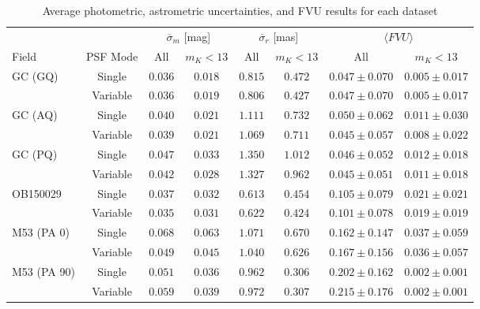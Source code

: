 \documentclass[]{spie}  %
\begin{document}
\begin{table}[!h]
\caption{Average photometric, astrometric uncertainties, and FVU results for each dataset}
\setlength{\tabcolsep}{7.0pt}
\begin{center}
\begin{tabular}{lccccccc}
    \hline\hline
    {} & {} & \multicolumn{2}{c}{$\overline{\sigma}_{m}$ [mag]} & \multicolumn{2}{c}{$\overline{\sigma}_{r}$ [mas]} & \multicolumn{2}{c}{$\langle FVU \rangle$}\\
    \cmidrule(lr){3-4}\cmidrule(l){5-6}\cmidrule(l){7-8}
        Field & PSF Mode & All & $m_{K} < 13$ & All & $m_{K} < 13$ & All & $m_{K} < 13$\\
        \hline
        \multirow{1}{*}{GC (GQ)} & Single & $0.036$ & $0.018$ & $0.815$ & $0.472$ & $0.047 \pm 0.070$ & $0.005 \pm 0.017$\\
        {} & Variable & $0.036$ & $0.019$ & $0.806$ &$0.427$ & $0.047 \pm 0.070$ & $0.005 \pm 0.017$\\
        \hline
        \multirow{1}{*}{GC (AQ)} & Single & $0.040$ & $0.021$ & $1.111$ & $0.732$ & $0.050 \pm 0.062$ & $0.011 \pm 0.030$\\
        {} & Variable & $0.039$ & $0.021$ & $1.069$ & $0.711$ & $0.045 \pm 0.057$ & $0.008 \pm 0.022$\\
        \hline
        \multirow{1}{*}{GC (PQ)} & Single & $0.047$ & $0.033$ & $1.350$ & $1.012$ & $0.046 \pm 0.052$ & $0.012 \pm 0.018$\\
        {} & Variable & $0.042$ & $0.028$ & $1.327$ & $0.962$ & $0.045 \pm 0.051$ & $0.011 \pm 0.018$\\
        \hline
        \multirow{1}{*}{OB150029} & Single & $0.037$ & $0.032$ & $0.613$ & $0.454$ & $0.105 \pm 0.079$ & $0.021 \pm 0.021$\\
        {} & Variable & $0.035$ & $0.031$ & $0.622$ & $0.424$ & $0.101 \pm 0.078$ & $0.019 \pm 0.019$\\
        \hline
        \multirow{1}{*}{M53 (PA 0)} & Single & $0.068$ &  $0.063$ & $1.071$ & $0.670$ & $0.162 \pm 0.147$ & $0.037 \pm 0.059$\\
        {} & Variable & $0.049$ &  $0.045$ & $1.040$ & $0.626$ & $0.167 \pm 0.156$ & $0.036 \pm 0.057$\\
        \hline
        \multirow{1}{*}{M53 (PA 90)} & Single & $0.051$ & $0.036$ & $0.962$ & $0.306$ & $0.202 \pm 0.162$ & $0.002 \pm 0.001$\\
        {} & Variable & $0.059$ & $0.039$ & $0.972$ & $0.307$ & $0.215 \pm 0.176$ & $0.002 \pm 0.001$\\\hline

\end{tabular}
\end{center}
\end{table}
\end{document}
